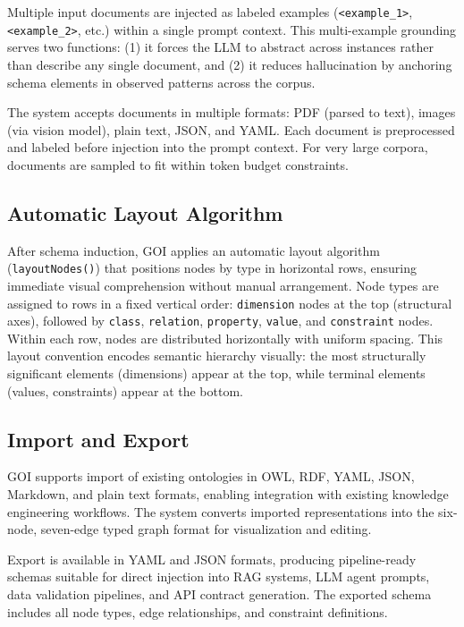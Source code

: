 \documentclass[runningheads,a4paper]{llncs}
\begin{document}
Multiple input documents are injected as labeled examples
(\texttt{<example\_1>}, \texttt{<example\_2>}, etc.) within a single
prompt context. This multi-example grounding serves two functions: (1)
it forces the LLM to abstract across instances rather than describe any
single document, and (2) it reduces hallucination by anchoring schema
elements in observed patterns across the corpus.

The system accepts documents in multiple formats: PDF (parsed to text),
images (via vision model), plain text, JSON, and YAML. Each document is
preprocessed and labeled before injection into the prompt context. For
very large corpora, documents are sampled to fit within token budget
constraints.

\subsection{Automatic Layout Algorithm}

After schema induction, GOI applies an automatic layout algorithm
(\texttt{layoutNodes()}) that positions nodes by type in horizontal
rows, ensuring immediate visual comprehension without manual
arrangement. Node types are assigned to rows in a fixed vertical order:
\texttt{dimension} nodes at the top (structural axes), followed by
\texttt{class}, \texttt{relation}, \texttt{property}, \texttt{value},
and \texttt{constraint} nodes. Within each row, nodes are distributed
horizontally with uniform spacing. This layout convention encodes
semantic hierarchy visually: the most structurally significant elements
(dimensions) appear at the top, while terminal elements (values,
constraints) appear at the bottom.

\subsection{Import and Export}

GOI supports import of existing ontologies in OWL, RDF, YAML, JSON,
Markdown, and plain text formats, enabling integration with existing
knowledge engineering workflows. The system converts imported
representations into the six-node, seven-edge typed graph format for
visualization and editing.

Export is available in YAML and JSON formats, producing
pipeline-ready schemas suitable for direct injection into RAG systems,
LLM agent prompts, data validation pipelines, and API contract
generation. The exported schema includes all node types, edge
relationships, and constraint definitions.
\end{document}
